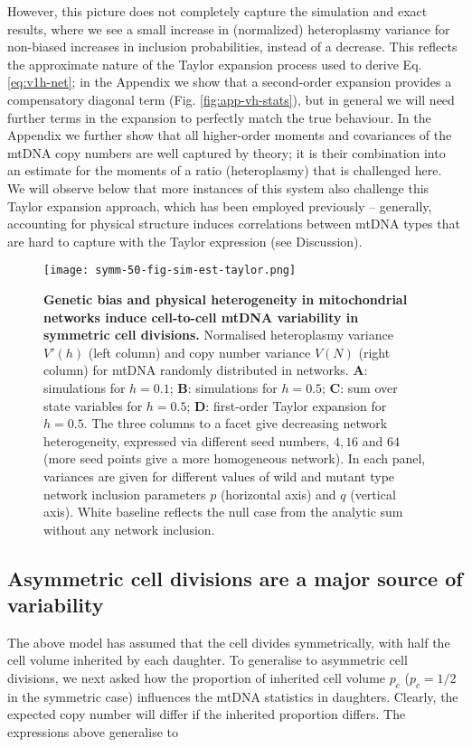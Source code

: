 \documentclass{article}
\begin{document}
However, this picture does not completely capture the simulation and exact results, where we see a small increase in (normalized) heteroplasmy variance for non-biased increases in inclusion probabilities, instead of a decrease. This reflects the approximate nature of the Taylor expansion process used to derive Eq. \ref{eq:v1h-net}; in the Appendix we show that a second-order expansion provides a compensatory diagonal term (Fig. \ref{fig:app-vh-stats}), but in general we will need further terms in the expansion to perfectly match the true behaviour.  In the Appendix we further show that all higher-order moments and covariances of the mtDNA copy numbers are well captured by theory; it is their combination into an estimate for the moments of a ratio (heteroplasmy) that is challenged here. We will observe below that more instances of this system also challenge this Taylor expansion approach, which has been employed previously \citep{johnston2015stochastic, hoitzing2017stochastic} -- generally, accounting for physical structure induces correlations between mtDNA types that are hard to capture with the Taylor expression (see Discussion).
\begin{figure}
\centering
\texttt{[image: symm-50-fig-sim-est-taylor.png]}
\caption{\textbf{Genetic bias and physical heterogeneity in mitochondrial networks induce cell-to-cell mtDNA variability in symmetric cell divisions.} Normalised heteroplasmy variance $V'(h)$ (left column) and copy number variance $V(N)$ (right column) for mtDNA randomly distributed in networks.  \textbf{A}: simulations for $h=0.1$; \textbf{B}: simulations for $h=0.5$; \textbf{C}: sum over state variables for $h=0.5$; \textbf{D}: first-order Taylor expansion for $h=0.5$. The three columns to a facet give decreasing network heterogeneity, expressed via different seed numbers, $4, 16$ and $64$ (more seed points give a more homogeneous network). In each panel, variances are given for different values of wild and mutant type network inclusion parameters $p$ (horizontal axis) and $q$ (vertical axis). White baseline reflects the null case from the analytic sum without any network inclusion.}\label{fig:sim-model-compare}
\end{figure}

\subsection{Asymmetric cell divisions are a major source of variability}
The above model has assumed that the cell divides symmetrically, with half the cell volume inherited by each daughter. To generalise to asymmetric cell divisions, we next asked how the proportion of inherited cell volume $p_c$ ($p_c = 1/2$ in the symmetric case) influences the mtDNA statistics in daughters. Clearly, the expected copy number will differ if the inherited proportion differs. The expressions above generalise to
\end{document}
